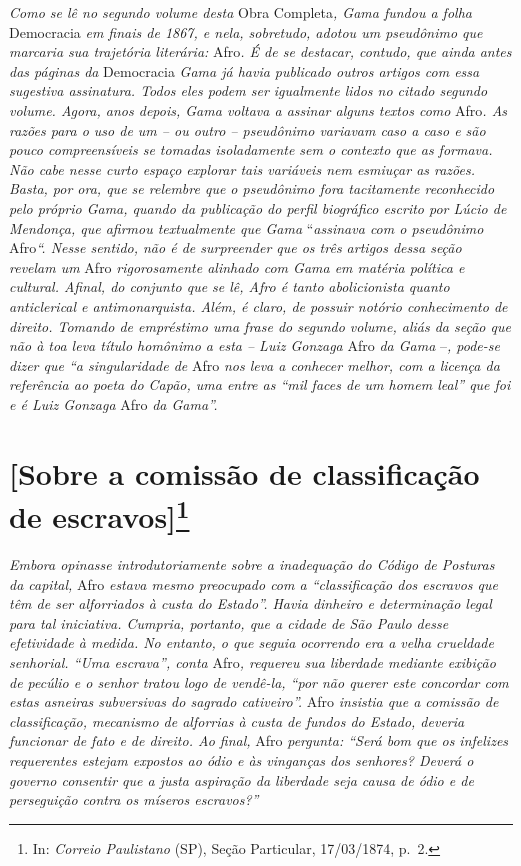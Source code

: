 \begin{didascalia}
\emph{Como se lê no segundo volume desta} Obra Completa\emph{, Gama
fundou a folha} Democracia \emph{em finais de 1867, e nela, sobretudo,
adotou um pseudônimo que marcaria sua trajetória literária:} Afro\emph{.
É de se destacar, contudo, que ainda antes das páginas da} Democracia
\emph{Gama já havia publicado outros artigos com essa sugestiva
assinatura. Todos eles podem ser igualmente lidos no citado segundo
volume. Agora, anos depois, Gama voltava a assinar alguns textos como}
Afro\emph{. As razões para o uso de um -- ou outro -- pseudônimo
variavam caso a caso e são pouco compreensíveis se tomadas isoladamente
sem o contexto que as formava. Não cabe nesse curto espaço explorar tais
variáveis nem esmiuçar as razões. Basta, por ora, que se relembre que o
pseudônimo fora tacitamente reconhecido pelo próprio Gama, quando da
publicação do perfil biográfico escrito por Lúcio de Mendonça, que
afirmou textualmente que Gama} ``\emph{assinava com o pseudônimo}
Afro\emph{``. Nesse sentido, não é de surpreender que os três artigos
dessa seção revelam um} Afro \emph{rigorosamente alinhado com Gama em
matéria política e cultural. Afinal, do conjunto que se lê, Afro é
tanto} \emph{abolicionista quanto anticlerical e antimonarquista. Além,
é claro, de possuir notório conhecimento de direito. Tomando de
empréstimo uma frase do segundo volume, aliás da seção que não à toa
leva título homônimo a esta -- Luiz Gonzaga} Afro \emph{da Gama}
--\emph{, pode-se dizer que ``a singularidade de} Afro \emph{nos leva a
conhecer melhor, com a licença da referência ao poeta do Capão, uma
entre as ``mil faces de um homem leal'' que foi e é Luiz Gonzaga} Afro
\emph{da Gama''.}
\end{didascalia}

\chapter{{[}Sobre a comissão de classificação 
de escravos{]}\footnote{ In: \emph{Correio Paulistano} (SP), Seção Particular, 17/03/1874, p.~2.}} %

\begin{didascalia}
\emph{Embora opinasse introdutoriamente sobre a inadequação do Código de
Posturas da capital,} Afro \emph{estava mesmo preocupado com a
``classificação dos escravos que têm de ser alforriados à custa do
Estado''. Havia dinheiro e determinação legal para tal iniciativa.
Cumpria, portanto, que a cidade de São Paulo desse efetividade à medida.
No entanto, o que seguia ocorrendo era a velha crueldade senhorial. ``Uma
escrava'', conta} Afro\emph{, requereu sua liberdade mediante exibição de
pecúlio e o senhor tratou logo de vendê-la, ``por não querer este
concordar com estas asneiras subversivas do sagrado cativeiro''.} Afro
\emph{insistia que a comissão de classificação, mecanismo de alforrias à
custa de fundos do Estado, deveria funcionar de fato e de direito. Ao
final,} Afro \emph{pergunta: ``Será bom que os infelizes requerentes
estejam expostos ao ódio e às vinganças dos senhores? Deverá o governo
consentir que a justa aspiração da liberdade seja causa de ódio e de
perseguição contra os míseros escravos?''}
\end{didascalia}


